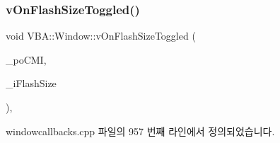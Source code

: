 \subsubsection{\texorpdfstring{v\+On\+Flash\+Size\+Toggled()}{vOnFlashSizeToggled()}}
{\footnotesize\ttfamily void V\+B\+A\+::\+Window\+::v\+On\+Flash\+Size\+Toggled (\begin{DoxyParamCaption}\item[{Gtk\+::\+Check\+Menu\+Item $\ast$}]{\+\_\+po\+C\+MI,  }\item[{\mbox{\hyperlink{_util_8cpp_a0ef32aa8672df19503a49fab2d0c8071}{int}}}]{\+\_\+i\+Flash\+Size }\end{DoxyParamCaption})\hspace{0.3cm}{\ttfamily [protected]}, {\ttfamily [virtual]}}



windowcallbacks.\+cpp 파일의 957 번째 라인에서 정의되었습니다.


